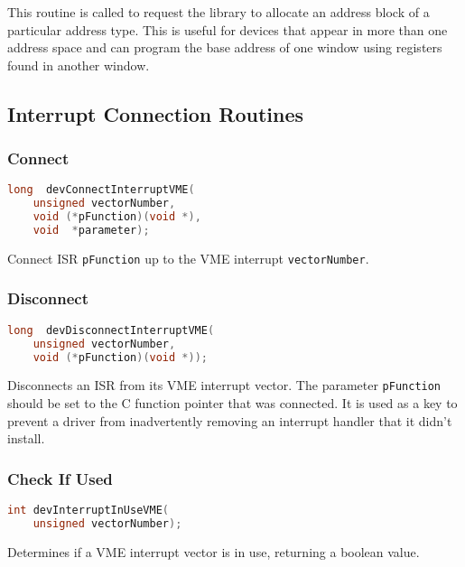 This routine is called to request the library to allocate an address block of a particular address type. This is useful for 
devices that appear in more than one address space and can program the base address of one window using registers found 
in another window.

\subsection{Interrupt Connection Routines}

\subsubsection{Connect}

\begin{lstlisting}[language=C]
long  devConnectInterruptVME(
    unsigned vectorNumber,
    void (*pFunction)(void *),
    void  *parameter);
\end{lstlisting}

Connect ISR \verb|pFunction| up to the VME interrupt \verb|vectorNumber|.

\subsubsection{Disconnect}

\begin{lstlisting}[language=C]
long  devDisconnectInterruptVME(
    unsigned vectorNumber,
    void (*pFunction)(void *));
\end{lstlisting}

Disconnects an ISR from its VME interrupt vector.
The parameter \verb|pFunction| should be set to the C function pointer that was connected.
It is used as a key to prevent a driver from inadvertently removing an interrupt handler that it didn't install.

\subsubsection{Check If Used}

\begin{lstlisting}[language=C]
int devInterruptInUseVME(
    unsigned vectorNumber);
\end{lstlisting}

Determines if a VME interrupt vector is in use, returning a boolean value.

